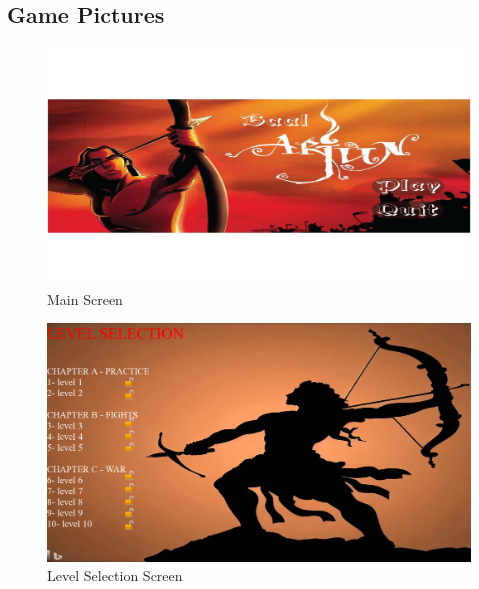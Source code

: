 \subsection{Game Pictures}
\vspace{2cm}
\begin{figure}[h]
	
	\centering
	\includegraphics[width = \textwidth]{sec/pdf/main}
	\caption{Main Screen}
\end{figure}
\vspace{2cm}
\begin{figure}[h]
	
	\centering
	\includegraphics[width = \textwidth]{sec/pdf/chapters}
	\caption{Level Selection Screen}
\end{figure}


